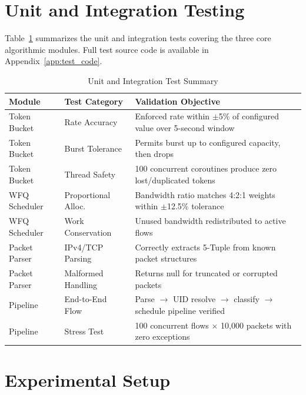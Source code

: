 \section{Unit and Integration Testing}
\label{sec:unit_tests}

Table~\ref{tab:test_summary} summarizes the unit and integration tests covering the three core algorithmic modules. Full test source code is available in Appendix~\ref{app:test_code}.

\begin{table}[H]
\centering
\caption{Unit and Integration Test Summary}
\label{tab:test_summary}
\begin{tabularx}{\textwidth}{l l X}
\toprule
\textbf{Module} & \textbf{Test Category} & \textbf{Validation Objective} \\
\midrule
Token Bucket & Rate Accuracy       & Enforced rate within $\pm$5\% of configured value over 5-second window \\
Token Bucket & Burst Tolerance     & Permits burst up to configured capacity, then drops \\
Token Bucket & Thread Safety       & 100 concurrent coroutines produce zero lost/duplicated tokens \\
\midrule
WFQ Scheduler & Proportional Alloc. & Bandwidth ratio matches 4:2:1 weights within $\pm$12.5\% tolerance \\
WFQ Scheduler & Work Conservation  & Unused bandwidth redistributed to active flows \\
\midrule
Packet Parser & IPv4/TCP Parsing   & Correctly extracts 5-Tuple from known packet structures \\
Packet Parser & Malformed Handling & Returns null for truncated or corrupted packets \\
\midrule
Pipeline      & End-to-End Flow    & Parse $\rightarrow$ UID resolve $\rightarrow$ classify $\rightarrow$ schedule pipeline verified \\
Pipeline      & Stress Test        & 100 concurrent flows $\times$ 10,000 packets with zero exceptions \\
\bottomrule
\end{tabularx}
\end{table}

\section{Experimental Setup}
\label{sec:experimental_setup}

